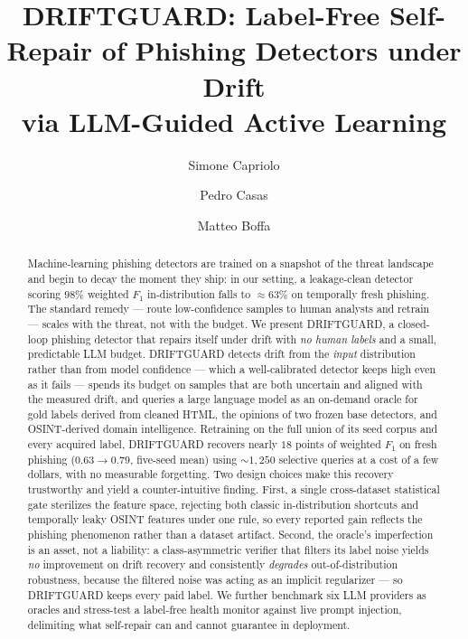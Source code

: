 \documentclass[10pt,sigconf,letterpaper,nonacm]{acmart}
\begin{document}
\title[DRIFTGUARD: Label-Free Self-Repair for Phishing Detection]%
{DRIFTGUARD: Label-Free Self-Repair of Phishing Detectors under Drift\\
via LLM-Guided Active Learning}

\author{Simone Capriolo}

\author{Pedro Casas}

\author{Matteo Boffa}

\renewcommand{\shortauthors}{Capriolo et al.}

\begin{abstract}
Machine-learning phishing detectors are trained on a snapshot of the threat
landscape and begin to decay the moment they ship: in our setting, a
leakage-clean detector scoring $98\%$ weighted $F_1$ in-distribution falls to
$\approx\!63\%$ on temporally fresh phishing. The standard remedy --- route
low-confidence samples to human analysts and retrain --- scales with the threat,
not with the budget. We present DRIFTGUARD, a closed-loop phishing detector that
repairs itself under drift with \emph{no human labels} and a small, predictable
LLM budget. DRIFTGUARD detects drift from the \emph{input} distribution rather
than from model confidence --- which a well-calibrated detector keeps high even
as it fails --- spends its budget on samples that are both uncertain and aligned
with the measured drift, and queries a large language model as an on-demand
oracle for gold labels derived from cleaned HTML, the opinions of two frozen
base detectors, and OSINT-derived domain intelligence. Retraining on the full
union of its seed corpus and every acquired label, DRIFTGUARD recovers nearly
$18$ points of weighted $F_1$ on fresh phishing ($0.63\!\to\!0.79$, five-seed
mean) using $\sim\!1{,}250$ selective queries at a cost of a few dollars, with no
measurable forgetting. Two design choices make this recovery trustworthy and
yield a counter-intuitive finding. First, a single cross-dataset statistical
gate sterilizes the feature space, rejecting both classic in-distribution
shortcuts and temporally leaky OSINT features under one rule, so every reported
gain reflects the phishing phenomenon rather than a dataset artifact. Second, the
oracle's imperfection is an asset, not a liability: a class-asymmetric verifier
that filters its label noise yields \emph{no} improvement on drift recovery and
consistently \emph{degrades} out-of-distribution robustness, because the filtered
noise was acting as an implicit regularizer --- so DRIFTGUARD keeps every paid
label. We further benchmark six LLM providers as oracles and stress-test a
label-free health monitor against live prompt injection, delimiting what
self-repair can and cannot guarantee in deployment.
\end{abstract}
\end{document}
